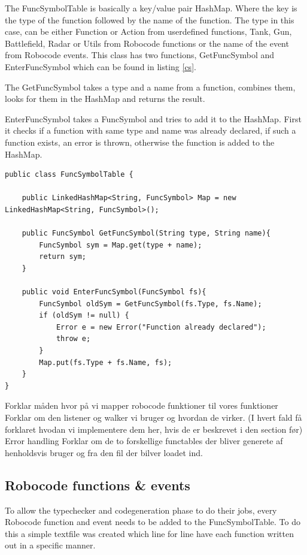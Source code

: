 The FuncSymbolTable is basically a key/value pair HashMap. Where the key is the type of the function followed by the name of the function. The type in this case, can be either Function or Action from userdefined functions, Tank, Gun, Battlefield, Radar or Utils from Robocode functions or the name of the event from Robocode events.
This class has two functions, GetFuncSymbol and EnterFuncSymbol which can be found in listing \ref{cs}. 

The GetFuncSymbol takes a type and a name from a function, combines them, looks for them in the HashMap and returns the result.

EnterFuncSymbol takes a FuncSymbol and tries to add it to the HashMap. First it checks if a function with same type and name was already declared, if such a function exists, an error is thrown, otherwise the function is added to the HashMap.

\begin{lstlisting}[caption="FuncSymbolTable", label="FST"]
public class FuncSymbolTable {

	public LinkedHashMap<String, FuncSymbol> Map = new LinkedHashMap<String, FuncSymbol>();

	public FuncSymbol GetFuncSymbol(String type, String name){
    	FuncSymbol sym = Map.get(type + name);
    	return sym;
	}

	public void EnterFuncSymbol(FuncSymbol fs){
    	FuncSymbol oldSym = GetFuncSymbol(fs.Type, fs.Name);
    	if (oldSym != null) {
        	Error e = new Error("Function already declared");
        	throw e;
    	}
    	Map.put(fs.Type + fs.Name, fs);
	}
}
\end{lstlisting}

Forklar måden hvor på vi mapper robocode funktioner til vores funktioner
Forklar om den listener og walker vi bruger og hvordan de virker. (I hvert fald  få forklaret hvodan vi implementere dem her, hvis de er beskrevet  i den section før)
Error handling
Forklar om de to forskellige functables der bliver generete af henholdsvis bruger og fra den fil der bilver loadet ind. 

\subsection{Robocode functions \& events}
To allow the typechecker and codegeneration phase to do their jobs, every Robocode function and event needs to be added to the FuncSymbolTable. To do this a simple textfile was created which line for line have each function written out in a specific manner. 

